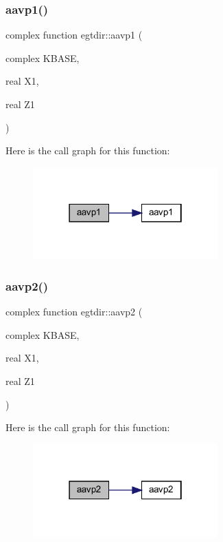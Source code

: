 \subsubsection{\texorpdfstring{aavp1()}{aavp1()}}
{\footnotesize\ttfamily complex function egtdir\+::aavp1 (\begin{DoxyParamCaption}\item[{complex}]{K\+B\+A\+SE,  }\item[{real}]{X1,  }\item[{real}]{Z1 }\end{DoxyParamCaption})}

Here is the call graph for this function\+:\nopagebreak
\begin{figure}[H]
\begin{center}
\leavevmode
\includegraphics[width=202pt]{Leroi__c_8f90_a2d69cada9a1fff81caa02d919be5ce7c_cgraph}
\end{center}
\end{figure}
\mbox{\label{Leroi__c_8f90_afeabf8ee47c9628f00ed2dfa98f56e40}} 
\subsubsection{\texorpdfstring{aavp2()}{aavp2()}}
{\footnotesize\ttfamily complex function egtdir\+::aavp2 (\begin{DoxyParamCaption}\item[{complex}]{K\+B\+A\+SE,  }\item[{real}]{X1,  }\item[{real}]{Z1 }\end{DoxyParamCaption})}

Here is the call graph for this function\+:\nopagebreak
\begin{figure}[H]
\begin{center}
\leavevmode
\includegraphics[width=202pt]{Leroi__c_8f90_afeabf8ee47c9628f00ed2dfa98f56e40_cgraph}
\end{center}
\end{figure}
\mbox{\label{Leroi__c_8f90_a485defa6db785c79bb6a092cd797ca0e}} 
